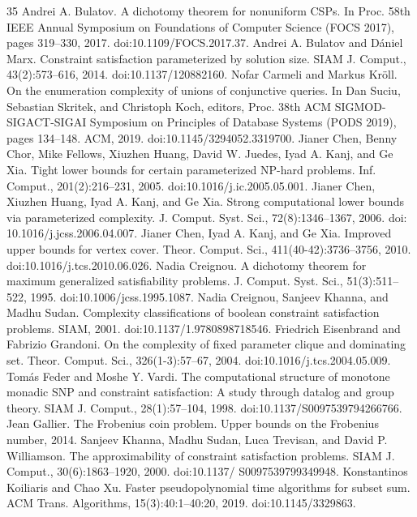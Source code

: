 \documentclass[10pt,a4paper]{article}
\theoremstyle{plain}
\begin{document}
\begin{thebibliography}{35}
Andrei A. Bulatov. A dichotomy theorem for nonuniform CSPs. In Proc. 58th IEEE Annual Symposium on Foundations of Computer Science (FOCS 2017), pages 319–330, 2017. doi:10.1109/FOCS.2017.37.
Andrei A. Bulatov and Dániel Marx. Constraint satisfaction parameterized by solution size. SIAM J. Comput., 43(2):573–616, 2014. doi:10.1137/120882160.
Nofar Carmeli and Markus Kröll. On the enumeration complexity of unions of conjunctive queries. In Dan Suciu, Sebastian Skritek, and Christoph Koch, editors, Proc. 38th ACM SIGMOD-SIGACT-SIGAI Symposium on Principles of Database Systems (PODS 2019), pages 134–148. ACM, 2019. doi:10.1145/3294052.3319700.
Jianer Chen, Benny Chor, Mike Fellows, Xiuzhen Huang, David W. Juedes, Iyad A. Kanj, and Ge Xia. Tight lower bounds for certain parameterized NP-hard problems. Inf. Comput., 201(2):216–231, 2005. doi:10.1016/j.ic.2005.05.001.
Jianer Chen, Xiuzhen Huang, Iyad A. Kanj, and Ge Xia. Strong computational lower bounds via parameterized complexity. J. Comput. Syst. Sci., 72(8):1346–1367, 2006. doi: 10.1016/j.jcss.2006.04.007.
Jianer Chen, Iyad A. Kanj, and Ge Xia. Improved upper bounds for vertex cover. Theor. Comput. Sci., 411(40-42):3736–3756, 2010. doi:10.1016/j.tcs.2010.06.026.
Nadia Creignou. A dichotomy theorem for maximum generalized satisfiability problems. J. Comput. Syst. Sci., 51(3):511–522, 1995. doi:10.1006/jcss.1995.1087.
Nadia Creignou, Sanjeev Khanna, and Madhu Sudan. Complexity classifications of boolean constraint satisfaction problems. SIAM, 2001. doi:10.1137/1.9780898718546.
Friedrich Eisenbrand and Fabrizio Grandoni. On the complexity of fixed parameter clique and dominating set. Theor. Comput. Sci., 326(1-3):57–67, 2004. doi:10.1016/j.tcs.2004.05.009.
Tomás Feder and Moshe Y. Vardi. The computational structure of monotone monadic SNP and constraint satisfaction: A study through datalog and group theory. SIAM J. Comput., 28(1):57–104, 1998. doi:10.1137/S0097539794266766.
Jean Gallier. The Frobenius coin problem. Upper bounds on the Frobenius number, 2014.
Sanjeev Khanna, Madhu Sudan, Luca Trevisan, and David P. Williamson. The approximability of constraint satisfaction problems. SIAM J. Comput., 30(6):1863–1920, 2000. doi:10.1137/ S0097539799349948.
Konstantinos Koiliaris and Chao Xu. Faster pseudopolynomial time algorithms for subset sum. ACM Trans. Algorithms, 15(3):40:1–40:20, 2019. doi:10.1145/3329863.

\end{thebibliography}
\end{document}
